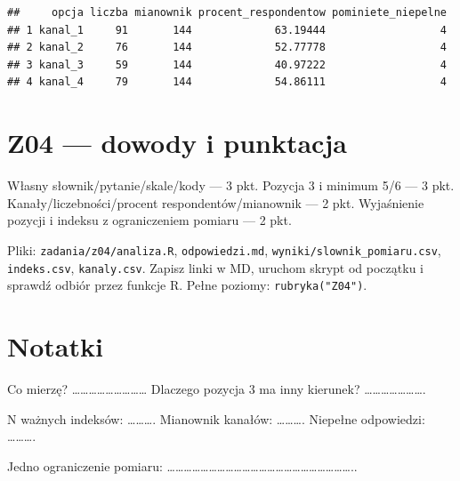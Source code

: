 \documentclass[
  polish,
  11pt,
  a4paper,
]{article}
\begin{document}
\begin{verbatim}
##     opcja liczba mianownik procent_respondentow pominiete_niepelne
## 1 kanal_1     91       144             63.19444                  4
## 2 kanal_2     76       144             52.77778                  4
## 3 kanal_3     59       144             40.97222                  4
## 4 kanal_4     79       144             54.86111                  4
\end{verbatim}

\section{Z04 --- dowody i punktacja}\label{z04-dowody-i-punktacja}

Własny słownik/pytanie/skale/kody --- 3 pkt. Pozycja 3 i minimum 5/6 ---
3 pkt. Kanały/liczebności/procent respondentów/mianownik --- 2 pkt.
Wyjaśnienie pozycji i indeksu z ograniczeniem pomiaru --- 2 pkt.

Pliki: \texttt{zadania/z04/analiza.R}, \texttt{odpowiedzi.md},
\texttt{wyniki/slownik\_pomiaru.csv}, \texttt{indeks.csv},
\texttt{kanaly.csv}. Zapisz linki w MD, uruchom skrypt od początku i
sprawdź odbiór przez funkcje R. Pełne poziomy: \texttt{rubryka("Z04")}.

\section{Notatki}\label{notatki}

Co mierzę? \ldots\ldots\ldots\ldots\ldots\ldots\ldots\ldots\ldots{}
Dlaczego pozycja 3 ma inny kierunek?
\ldots\ldots\ldots\ldots\ldots\ldots\ldots.

N ważnych indeksów: \ldots\ldots\ldots. Mianownik kanałów:
\ldots\ldots\ldots. Niepełne odpowiedzi: \ldots\ldots\ldots.

Jedno ograniczenie pomiaru:
\ldots\ldots\ldots\ldots\ldots\ldots\ldots\ldots\ldots\ldots\ldots\ldots\ldots\ldots\ldots\ldots\ldots\ldots\ldots\ldots\ldots\ldots..
\end{document}

